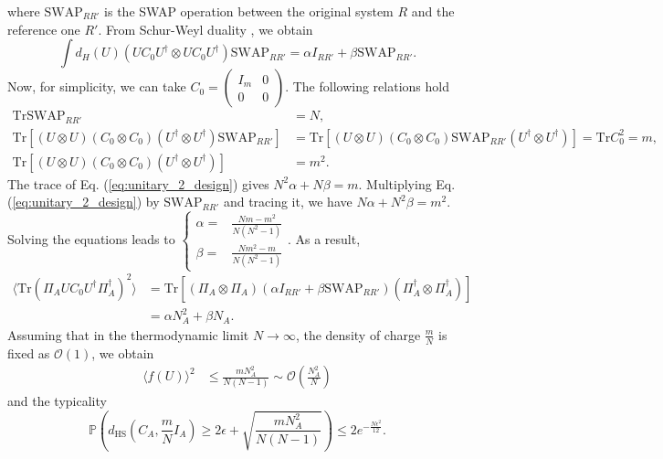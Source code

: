 \documentclass[aps,onecolumn,nofootinbib,superscriptaddress,notitlepage,longbibliography]{revtex4-1}
\begin{document}
where $\mathrm{SWAP}_{RR'}$ is the SWAP operation between the original
system $R$ and the reference one $R'$. From Schur-Weyl duality \citep{Hayashi2017}, we obtain
\begin{equation}
\int d_{H}(U)(UC_{0}U^{\dagger}\otimes  UC_{0}U^{\dagger})\mathrm{SWAP}_{RR'}=\alpha I_{RR'}+\beta\mathrm{SWAP}_{RR'}.
\label{eq:unitary_2_design}
\end{equation}
Now, for simplicity, we can take $C_{0}=\begin{pmatrix}I_{m} & 0\\
0 & 0
\end{pmatrix}$. The following relations hold
\begin{align*}
\text{Tr}\mathrm{SWAP}_{RR'} & =N,\\
\mathrm{Tr}[(U\otimes  U)(C_{0}\otimes  C_{0}) (U^{\dagger}\otimes  U^{\dagger})\mathrm{SWAP}_{RR'}] & =\mathrm{Tr}[(U\otimes  U)(C_{0}\otimes  C_{0})\mathrm{SWAP}_{RR'} (U^{\dagger}\otimes  U^{\dagger})] =\mathrm{Tr}C_{0}^{2}=m,\\
\mathrm{Tr}[(U\otimes  U) (C_{0}\otimes  C_{0}) (U^{\dagger}\otimes  U^{\dagger})] & =m^{2}.
\end{align*}
The trace of Eq. (\ref{eq:unitary_2_design}) gives $N^{2}\alpha+N\beta=m$.
Multiplying Eq. (\ref{eq:unitary_2_design}) by $\mathrm{SWAP}_{RR'}$
and tracing it, we have $N\alpha+N^{2}\beta=m^{2}$. Solving the equations
leads to $\begin{cases}
\alpha= & \frac{Nm-m^{2}}{N(N^{2}-1)}\\
\beta= & \frac{Nm^{2}-m}{N(N^{2}-1)}
\end{cases}.$ As a result, ~
\begin{align}
\langle\mathrm{Tr}(\Pi_{A}UC_{0}U^{\dagger}\Pi_{A}^{\dagger})^{2}\rangle & =\mathrm{Tr}[(\Pi_{A}\otimes \Pi_{A})(\alpha I_{RR'}+\beta\mathrm{SWAP}_{RR'})(\Pi_{A}^{\dagger}\otimes \Pi_{A}^{\dagger}\nonumber)] \\
 & =\alpha N_{A}^{2}+\beta N_{A}.
 \label{eq:value_of_average_of_tracesquare}
\end{align}
Assuming that in the thermodynamic limit $N\to\infty$, the density of charge
$\frac{m}{N}$ is fixed as $\mathcal{O}(1)$, we obtain
\begin{align*}
\langle f(U)\rangle^{2} & \leq\frac{mN_{A}^{2}}{N(N-1)}\sim \mathcal{O}\left(\frac{N_{A}^{2}}{N}\right)
\end{align*}
and the typicality
\begin{equation}
\mathbb{P}\left(d_{\mathrm{HS}}\left(C_{A},\frac{m}{N}I_{A}\right)\geq2\epsilon+\sqrt{\frac{mN_{A}^{2}}{N(N-1)}}\right)\leq2e^{-\frac{N\epsilon^{2}}{12}}.
\label{eq:meassure_concentration_on_covariance_matrix}
\end{equation}
\end{document}
